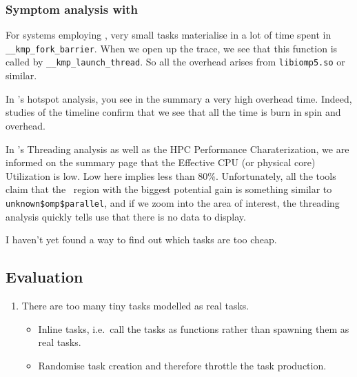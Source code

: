 \subsubsection{Symptom analysis with \openmp}
For systems employing \openmp, very small tasks materialise in a lot of time spent in \texttt{\_\_kmp\_fork\_barrier}.
When we open up the trace, we see that this function is called by \texttt{\_\_kmp\_launch\_thread}.
So all the overhead arises from \texttt{libiomp5.so} or similar.



\begin{instructions}{\vtune}
 In \vtune's hotspot analysis, you see in the summary a very high overhead time.
 Indeed, studies of the timeline confirm that we see that all the time is burn in spin and overhead. 
 
 In \vtune's Threading analysis as well as the HPC Performance Charaterization, we are informed on the summary page that the Effective CPU (or physical core) Utilization is low.
 Low here implies less than 80\%.
 Unfortunately, all the tools claim that the \openmp~region with the biggest potential gain is something similar to
 \texttt{unknown\$omp\$parallel}, and if we zoom into the area of interest, the threading analysis quickly tells use that there is no data to display.
\end{instructions}



\begin{wip}
 I haven't yet found a way to find out which tasks are too cheap. 
\end{wip}

\subsection{Evaluation}


\begin{enumerate}[noitemsep]
  \item[$\boxtimes$] There are too many tiny tasks modelled as real tasks.
    \begin{itemize}[noitemsep]
      \item[$\Rightarrow $] Inline tasks, i.e.~call the tasks as functions rather than spawning them as real tasks.
      \item[$\Rightarrow $] Randomise task creation and therefore throttle the task production.
    \end{itemize}
\end{enumerate}


